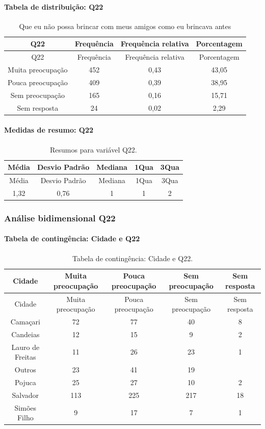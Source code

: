 \documentclass[]{article}
\let\oldparagraph\paragraph
\renewcommand{\paragraph}[1]{\oldparagraph{#1}\mbox{}}
\begin{document}
\hypertarget{tabela-de-distribuiuxe7uxe3o-q22}{%
\paragraph{Tabela de distribuição: Q22}\label{tabela-de-distribuiuxe7uxe3o-q22}}

\begin{longtable}[]{@{}cccc@{}}
\caption{\label{tab:unnamed-chunk-483}Que eu não possa brincar com meus amigos como eu brincava antes}\tabularnewline
\toprule
Q22 & Frequência & Frequência relativa & Porcentagem\tabularnewline
\midrule
\endfirsthead
\toprule
Q22 & Frequência & Frequência relativa & Porcentagem\tabularnewline
\midrule
\endhead
Muita preocupação & 452 & 0,43 & 43,05\tabularnewline
Pouca preocupação & 409 & 0,39 & 38,95\tabularnewline
Sem preocupação & 165 & 0,16 & 15,71\tabularnewline
Sem resposta & 24 & 0,02 & 2,29\tabularnewline
\bottomrule
\end{longtable}

\hypertarget{medidas-de-resumo-q22}{%
\paragraph{Medidas de resumo: Q22}\label{medidas-de-resumo-q22}}

\begin{longtable}[]{@{}ccccc@{}}
\caption{\label{tab:unnamed-chunk-484}Resumos para variável Q22.}\tabularnewline
\toprule
Média & Desvio Padrão & Mediana & 1Qua & 3Qua\tabularnewline
\midrule
\endfirsthead
\toprule
Média & Desvio Padrão & Mediana & 1Qua & 3Qua\tabularnewline
\midrule
\endhead
1,32 & 0,76 & 1 & 1 & 2\tabularnewline
\bottomrule
\end{longtable}

\cleardoublepage

\hypertarget{anuxe1lise-bidimensional-q22}{%
\subsubsection{Análise bidimensional Q22}\label{anuxe1lise-bidimensional-q22}}

\hypertarget{tabela-de-continguxeancia-cidade-e-q22}{%
\paragraph{Tabela de contingência: Cidade e Q22}\label{tabela-de-continguxeancia-cidade-e-q22}}

\begin{longtable}[]{@{}ccccc@{}}
\caption{\label{tab:unnamed-chunk-485}Tabela de contingência: Cidade e Q22.}\tabularnewline
\toprule
Cidade & Muita preocupação & Pouca preocupação & Sem preocupação & Sem resposta\tabularnewline
\midrule
\endfirsthead
\toprule
Cidade & Muita preocupação & Pouca preocupação & Sem preocupação & Sem resposta\tabularnewline
\midrule
\endhead
Camaçari & 72 & 77 & 40 & 8\tabularnewline
Candeias & 12 & 15 & 9 & 2\tabularnewline
Lauro de Freitas & 11 & 26 & 23 & 1\tabularnewline
Outros & 23 & 41 & 19 &\tabularnewline
Pojuca & 25 & 27 & 10 & 2\tabularnewline
Salvador & 113 & 225 & 217 & 18\tabularnewline
Simões Filho & 9 & 17 & 7 & 1\tabularnewline
\bottomrule
\end{longtable}
\end{document}
